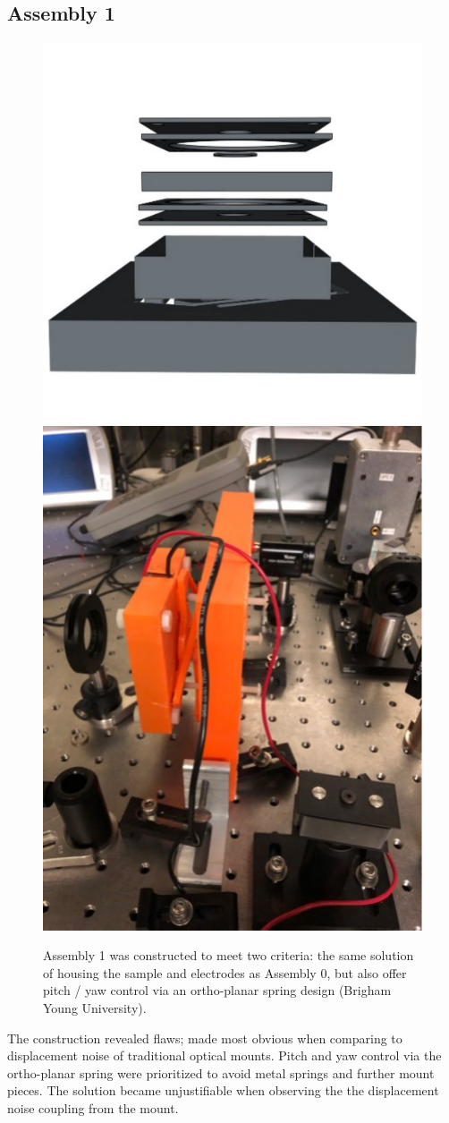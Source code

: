 \subsection{Assembly 1}

\begin{figure}[!ht]
    \begin{subcaptiongroup}
	    \includegraphics[width=.5\textwidth]{figs/ALGAAS/assemblies/assembly1/assembly1_dissassembled.pdf}
	    \label{A1disassembled}
	    \includegraphics[width=.5\textwidth]{figs/ALGAAS/assemblies/assembly1/assembly1_flaw.pdf}
	    \label{A1flaw}
    \end{subcaptiongroup}
    \caption{Assembly 1 was constructed to meet two criteria: the same solution of housing the sample and electrodes as Assembly 0, but also offer pitch / yaw control via an ortho-planar spring design (Brigham Young University).}
    \label{fig:A1pt0}
\end{figure}
\FloatBarrier


The construction revealed flaws; made most obvious when comparing to displacement noise of traditional optical mounts. Pitch and yaw control via the ortho-planar spring were prioritized to avoid metal springs and further mount pieces. The solution became unjustifiable when observing the the displacement noise coupling from the mount.

